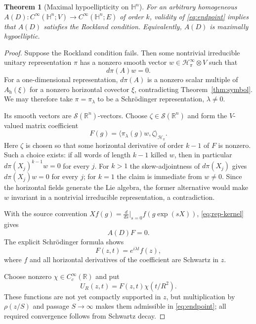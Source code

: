 \documentclass[11pt]{article}
\newtheorem{theorem}{Theorem}
\newcommand{\R}{\mathbb R}
\newcommand{\Sch}{\mathcal S}
\begin{document}
\begin{theorem}[Maximal hypoellipticity on $\mathbb H^n$]\label{thm:heis}
For an arbitrary homogeneous $A(D):C^\infty(\mathbb H^n;V)\to
C^\infty(\mathbb H^n;E)$ of order $k$, validity of
\eqref{eq:endpoint} implies that $A(D)$ satisfies the Rockland condition.
Equivalently, $A(D)$ is maximally hypoelliptic.
\end{theorem}

\begin{proof}
Suppose the Rockland condition fails.  Then some nontrivial irreducible
unitary representation $\pi$ has a nonzero smooth vector
$w\in\mathcal H_\pi^\infty\otimes V$ such that
\begin{equation}\label{eq:rep-kernel}
 d\pi(A)w=0.
\end{equation}
For a one-dimensional representation, $d\pi(A)$ is a nonzero scalar multiple
of $A_{\mathrm h}(\xi)$ for a nonzero horizontal covector $\xi$, contradicting
Theorem~\ref{thm:symbol}.  We may therefore take $\pi=\pi_\lambda$ to be a
Schr\"odinger representation, $\lambda\ne0$.

Its smooth vectors are $\Sch(\R^n)$-vectors.  Choose
$\zeta\in\Sch(\R^n)$ and form the $V$-valued matrix coefficient
\begin{equation}\label{eq:coefficient}
 F(g)=\langle\pi_\lambda(g)w,\zeta\rangle_{\mathcal H_\pi}.
\end{equation}
Here $\zeta$ is chosen so that some horizontal derivative of order $k-1$ of
$F$ is nonzero.  Such a choice exists: if all words of length $k-1$ killed
$w$, then in particular $d\pi(X_j)^{k-1}w=0$ for every $j$.  For $k>1$ the
skew-adjointness of $d\pi(X_j)$ gives $d\pi(X_j)w=0$ for every $j$; for $k=1$
the claim is immediate from $w\ne0$.  Since the horizontal fields generate
the Lie algebra, the former alternative would make $w$ invariant in a
nontrivial irreducible representation, a contradiction.

With the source convention $Xf(g)=\frac d{ds}|_{s=0}f(g\exp(sX))$,
\eqref{eq:rep-kernel} gives
\begin{equation}\label{eq:AFzero}
 A(D)F=0.
\end{equation}
The explicit Schr\"odinger formula shows
\[
 F(z,t)=e^{i\lambda t}f(z),
\]
where $f$ and all horizontal derivatives of the coefficient are Schwartz in
$z$.

Choose nonzero $\chi\in C_c^\infty(\R)$ and put
\[
 U_R(z,t)=F(z,t)\chi(t/R^2).
\]
These functions are not yet compactly supported in $z$, but multiplication
by $\rho(z/S)$ and passage $S\to\infty$ makes them admissible in
\eqref{eq:endpoint}; all required convergence follows from Schwartz decay.


\end{proof}
\end{document}
